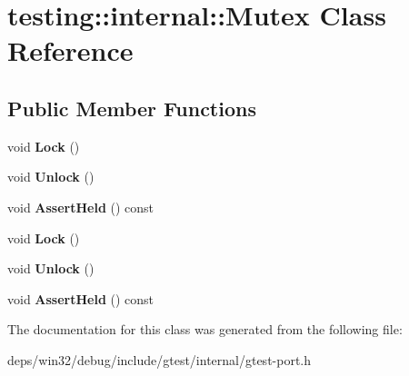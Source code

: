 \hypertarget{classtesting_1_1internal_1_1_mutex}{}\section{testing\+:\+:internal\+:\+:Mutex Class Reference}
\label{classtesting_1_1internal_1_1_mutex}
\subsection*{Public Member Functions}
\begin{DoxyCompactItemize}
\item 
\hypertarget{classtesting_1_1internal_1_1_mutex_ae7e2191886c00182176b23c4f4d049f8}{}void {\bfseries Lock} ()\label{classtesting_1_1internal_1_1_mutex_ae7e2191886c00182176b23c4f4d049f8}

\item 
\hypertarget{classtesting_1_1internal_1_1_mutex_a315188055de1be98884519ad84eff2e6}{}void {\bfseries Unlock} ()\label{classtesting_1_1internal_1_1_mutex_a315188055de1be98884519ad84eff2e6}

\item 
\hypertarget{classtesting_1_1internal_1_1_mutex_a3a0530bca3110025d85b2aa51f3ca0d7}{}void {\bfseries Assert\+Held} () const \label{classtesting_1_1internal_1_1_mutex_a3a0530bca3110025d85b2aa51f3ca0d7}

\item 
\hypertarget{classtesting_1_1internal_1_1_mutex_ae7e2191886c00182176b23c4f4d049f8}{}void {\bfseries Lock} ()\label{classtesting_1_1internal_1_1_mutex_ae7e2191886c00182176b23c4f4d049f8}

\item 
\hypertarget{classtesting_1_1internal_1_1_mutex_a315188055de1be98884519ad84eff2e6}{}void {\bfseries Unlock} ()\label{classtesting_1_1internal_1_1_mutex_a315188055de1be98884519ad84eff2e6}

\item 
\hypertarget{classtesting_1_1internal_1_1_mutex_a3a0530bca3110025d85b2aa51f3ca0d7}{}void {\bfseries Assert\+Held} () const \label{classtesting_1_1internal_1_1_mutex_a3a0530bca3110025d85b2aa51f3ca0d7}

\end{DoxyCompactItemize}


The documentation for this class was generated from the following file\+:\begin{DoxyCompactItemize}
\item 
deps/win32/debug/include/gtest/internal/gtest-\/port.\+h\end{DoxyCompactItemize}

